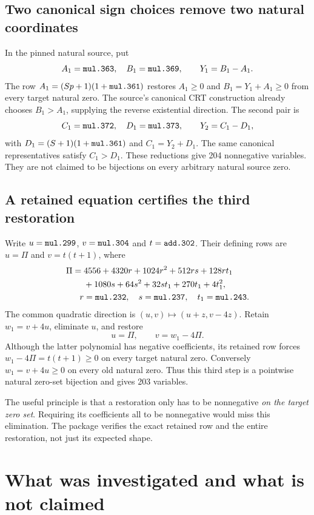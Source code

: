 \documentclass[11pt]{article}
\theoremstyle{remark}\newtheorem{remark}[theorem]{Remark}
\newcommand{\code}[1]{\texttt{\detokenize{#1}}}
\begin{document}
\subsection{Two canonical sign choices remove two natural coordinates}

In the pinned natural source, put
\[
 A_1=\code{mul.363},\quad B_1=\code{mul.369},
 \qquad Y_1=B_1-A_1.
\]
The row $A_1=(Sp+1)(1+\code{mul.361})$ restores $A_1\ge0$ and
$B_1=Y_1+A_1\ge0$ from every target natural zero. The source's canonical
CRT construction already chooses $B_1>A_1$, supplying the reverse
existential direction. The second pair is
\[
 C_1=\code{mul.372},\quad D_1=\code{mul.373},
 \qquad Y_2=C_1-D_1,
\]
with $D_1=(S+1)(1+\code{mul.361})$ and $C_1=Y_2+D_1$.
The same canonical representatives satisfy $C_1>D_1$.
These reductions give 204 nonnegative variables. They are not claimed to
be bijections on every arbitrary natural source zero.

\subsection{A retained equation certifies the third restoration}

Write $u=\code{mul.299}$, $v=\code{mul.304}$ and
$t=\code{add.302}$. Their defining rows are
$u=\Pi$ and $v=t(t+1)$, where
\begin{align*}
 \Pi={}&4556+4320r+1024r^2+512rs+128rt_1\\
       &{}+1080s+64s^2+32st_1+270t_1+4t_1^2,\\
 r&=\code{mul.232},\quad s=\code{mul.237},\quad
 t_1=\code{mul.243}.
\end{align*}
The common quadratic direction is $(u,v)\mapsto(u+z,v-4z)$.
Retain $w_1=v+4u$, eliminate $u$, and restore
\[
 u=\Pi,\qquad v=w_1-4\Pi.
\]
Although the latter polynomial has negative coefficients, its retained
row forces $w_1-4\Pi=t(t+1)\ge0$ on every target natural zero.
Conversely $w_1=v+4u\ge0$ on every old natural zero. Thus this third
step is a pointwise natural zero-set bijection and gives 203 variables.

The useful principle is that a restoration only has to be nonnegative
\emph{on the target zero set}. Requiring its coefficients all to be
nonnegative would miss this elimination. The package verifies the exact
retained row and the entire restoration, not just its expected shape.

\section{What was investigated and what is not claimed}
\end{document}
